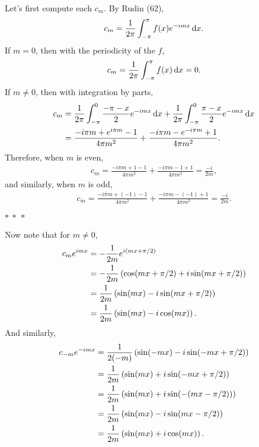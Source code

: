\documentclass[12pt]{article}
\begin{document}
\begin{fproof}[3(a)]
 Let's first compute each \(c_m\).
 By Rudin (62),
 \begin{align*}
   c_m 
   = \frac{1}{2\pi} \int_{-\pi}^{\pi} f(x) e^{-imx} \mathop{}\!\mathrm{d} x.
 \end{align*}
 If \(m = 0\), then with the periodicity of the \(f\),
 \begin{align*}
   c_m = \frac{1}{2 \pi} \int_{-\pi}^{\pi} f(x) \mathop{}\!\mathrm{d} x = 0.
 \end{align*}
 If \(m \neq 0\), then with integration by parts,
 \begin{align*}
   c_m 
   &= \frac{1}{2\pi} \int_{-\pi}^{0} \frac{-\pi-x}{2} e^{-imx} \mathop{}\!\mathrm{d} x + \frac{1}{2\pi} \int_{-\pi}^{0} \frac{\pi-x}{2} e^{-imx} \mathop{}\!\mathrm{d} x\\
   & = \frac{-i\pi m +e^{i\pi m} - 1}{4 \pi m^2} + \frac{-i\pi m - e^{-i\pi m} + 1}{4 \pi m^2}.
 \end{align*}
 Therefore, when \(m\) is even,
 \begin{align*}
   c_m = \frac{-i \pi m + 1 - 1}{4 \pi m^2} + \frac{-i \pi m - 1 + 1}{4 \pi m^2} = \frac{-i}{2m},
 \end{align*}
 and similarly, when \(m\) is odd,
 \begin{align*}
   c_m = \frac{-i \pi m + (-1) - 1}{4 \pi m^2} + \frac{-i \pi m - (-1) + 1}{4 \pi m^2} = \frac{-i}{2m}.
 \end{align*}
 \begin{center}
   \(\ast~\ast~\ast\)
 \end{center}
 Now note that for \(m \neq 0\),
 \begin{align*}
   c_m e^{imx}
   &= -\frac{1}{2m}e^{i(mx + \pi/2)}\\
   &= -\frac{1}{2m} \left( \cos(mx + \pi/2) + i \sin(mx + \pi/2) \right)\\
   &= \frac{1}{2m} \left( \sin(mx) - i \sin(mx + \pi/2) \right)\\
   &= \frac{1}{2m} \left( \sin(mx) - i\cos(mx) \right).
 \end{align*}
 And similarly,
 \begin{align*}
   c_{-m}e^{-imx}
   & = \frac{1}{2(-m)}\left( \sin(-mx) - i\sin(-mx + \pi/2) \right)\\
   &=\frac{1}{2m} \left( \sin(mx) + i\sin(-mx + \pi/2) \right)\\
   &= \frac{1}{2m} \left( \sin(mx) + i\sin(-(mx - \pi/2)) \right)\\
   &=\frac{1}{2m} \left( \sin(mx) - i\sin(mx - \pi/2) \right)\\
   &=\frac{1}{2m} \left( \sin(mx) + i\cos(mx) \right).
 \end{align*}

\end{fproof}
\end{document}
